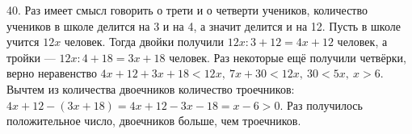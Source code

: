 40. Раз имеет смысл говорить о трети и о четверти учеников, количество учеников в школе делится на 3 и на 4, а значит делится и на 12. Пусть в школе учится $12x$ человек. Тогда двойки получили $12x:3+12=4x+12$ человек, а тройки --- $12x:4+18=3x+18$ человек. Раз некоторые ещё получили четвёрки, верно неравенство $4x+12+3x+18<12x,\ 7x+30<12x,\ 30<5x,\ x>6.$ Вычтем из количества двоечников количество троечников: $4x+12-(3x+18)=4x+12-3x-18=x-6>0.$ Раз получилось положительное число, двоечников больше, чем троечников.\\
